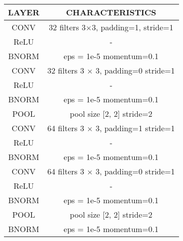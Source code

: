 \begin{table}[]
\centering
\begin{tabular}{|c|c|}
\hline
\textbf{LAYER} & \cellcolor[HTML]{FFFFFF}\textbf{CHARACTERISTICS}          \\ \hline
\rowcolor[HTML]{CBCEFB} 
CONV           & 32 filters 3$\times$3, padding=1, stride=1                \\ \hline
\rowcolor[HTML]{EFEFEF} 
ReLU           & -                                                         \\ \hline
\rowcolor[HTML]{C3EDF8} 
BNORM          & eps = 1e-5 momentum=0.1                                   \\ \hline
\rowcolor[HTML]{CBCEFB} 
CONV           & 32 filters 3 $\times$ 3, padding=0 stride=1               \\ \hline
\rowcolor[HTML]{EFEFEF} 
ReLU           & -                                                         \\ \hline
\rowcolor[HTML]{C3EDF8} 
BNORM          & eps = 1e-5 momentum=0.1                                   \\ \hline
\rowcolor[HTML]{FFCCC9} 
POOL           & pool size {[}2, 2{]} stride=2                             \\ \hline
\rowcolor[HTML]{CBCEFB} 
CONV           & 64 filters 3 $\times$ 3, padding=1 stride=1               \\ \hline
\rowcolor[HTML]{EFEFEF} 
ReLU           & -                                                         \\ \hline
\rowcolor[HTML]{C3EDF8} 
BNORM          & eps = 1e-5 momentum=0.1                                   \\ \hline
\rowcolor[HTML]{CBCEFB} 
CONV           & 64 filters 3 $\times$ 3, padding=0 stride=1               \\ \hline
\rowcolor[HTML]{EFEFEF} 
ReLU           & -                                                         \\ \hline
\rowcolor[HTML]{C3EDF8} 
BNORM          & eps = 1e-5 momentum=0.1                                   \\ \hline
\rowcolor[HTML]{FFCCC9} 
POOL           & pool size {[}2, 2{]} stride=2                             \\ \hline
\rowcolor[HTML]{C3EDF8} 
BNORM          & eps = 1e-5 momentum=0.1                                   \\ \hline

\end{tabular}
\end{table}
